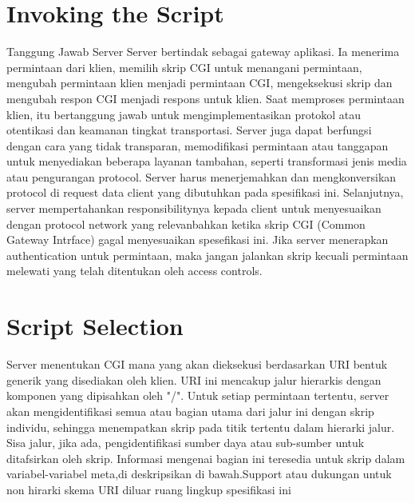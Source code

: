 \documentclass{article}
\begin{document}
\section{Invoking the Script}
Tanggung Jawab Server
Server bertindak sebagai gateway aplikasi. Ia menerima permintaan dari klien, memilih skrip CGI untuk menangani permintaan, mengubah permintaan klien menjadi permintaan CGI, mengeksekusi skrip dan mengubah respon CGI menjadi respons untuk klien. Saat memproses permintaan klien, itu bertanggung jawab untuk mengimplementasikan protokol atau otentikasi dan keamanan tingkat transportasi. Server juga dapat berfungsi dengan cara yang tidak transparan, memodifikasi permintaan atau tanggapan untuk menyediakan beberapa layanan tambahan, seperti transformasi jenis media atau pengurangan protocol.
Server harus menerjemahkan dan mengkonversikan protocol di request data client yang dibutuhkan pada spesifikasi ini. Selanjutnya, server mempertahankan responsibilitynya kepada client untuk menyesuaikan dengan protocol network yang relevanbahkan ketika skrip CGI (Common Gateway Intrface) gagal menyesuaikan spesefikasi ini.
Jika server menerapkan authentication untuk permintaan, maka jangan jalankan skrip kecuali permintaan melewati  yang telah ditentukan oleh access controls.
\section{Script Selection}
Server menentukan CGI mana yang akan dieksekusi berdasarkan URI bentuk generik yang disediakan oleh klien. URI ini mencakup jalur hierarkis dengan komponen yang dipisahkan oleh "/". Untuk setiap permintaan tertentu, server akan mengidentifikasi semua atau bagian utama dari jalur ini dengan skrip individu, sehingga menempatkan skrip pada titik tertentu dalam hierarki jalur. Sisa jalur, jika ada, pengidentifikasi sumber daya atau sub-sumber untuk ditafsirkan oleh skrip.
Informasi mengenai bagian ini teresedia untuk skrip dalam variabel-variabel meta,di deskripsikan di bawah.Support atau dukungan untuk non hirarki skema URI diluar ruang lingkup spesifikasi ini
\end{document}
